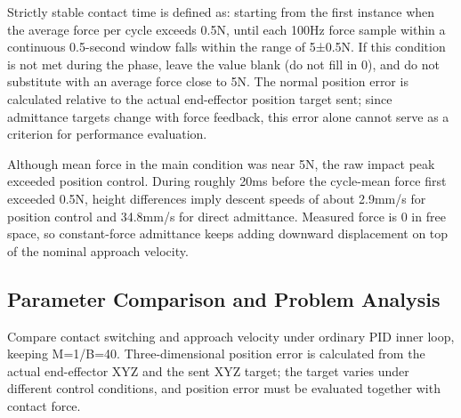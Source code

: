 Strictly stable contact time is defined as: starting from the first instance when the average force per cycle exceeds 0.5N, until each 100Hz force sample within a continuous 0.5-second window falls within the range of 5±0.5N. If this condition is not met during the phase, leave the value blank (do not fill in 0), and do not substitute with an average force close to 5N. The normal position error is calculated relative to the actual end-effector position target sent; since admittance targets change with force feedback, this error alone cannot serve as a criterion for performance evaluation.




Although mean force in the main condition was near 5N, the raw impact peak exceeded position control. During roughly 20ms before the cycle-mean force first exceeded 0.5N, height differences imply descent speeds of about 2.9mm/s for position control and 34.8mm/s for direct admittance. Measured force is 0 in free space, so constant-force admittance keeps adding downward displacement on top of the nominal approach velocity.

\subsection{Parameter Comparison and Problem Analysis}\label{s11-detail-4}

Compare contact switching and approach velocity under ordinary PID inner loop, keeping M=1/B=40. Three-dimensional position error is calculated from the actual end-effector XYZ and the sent XYZ target; the target varies under different control conditions, and position error must be evaluated together with contact force.

